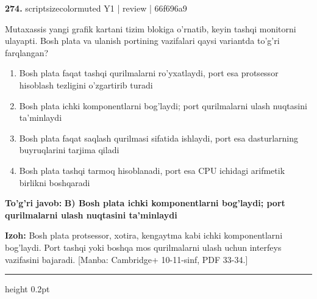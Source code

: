 \documentclass[10pt,a4paper]{article}
\begin{document}
{\bfseries\sffamily\color{ink} 274.} {scriptsizecolor{muted} Y1 | review | 66f696a9}
\par
Mutaxassis yangi grafik kartani tizim blokiga o'rnatib, keyin tashqi monitorni ulayapti. Bosh plata va ulanish portining vazifalari qaysi variantda to'g'ri farqlangan?
\begin{enumerate}[label=\Alph*),leftmargin=9mm]
\item Bosh plata faqat tashqi qurilmalarni ro'yxatlaydi, port esa protsessor hisoblash tezligini o'zgartirib turadi
\item Bosh plata ichki komponentlarni bog'laydi; port qurilmalarni ulash nuqtasini ta'minlaydi
\item Bosh plata faqat saqlash qurilmasi sifatida ishlaydi, port esa dasturlarning buyruqlarini tarjima qiladi
\item Bosh plata tashqi tarmoq hisoblanadi, port esa CPU ichidagi arifmetik birlikni boshqaradi
\end{enumerate}
\begin{tcolorbox}[enhanced,breakable,colback=teal!4,colframe=teal!60!black,boxrule=0.45pt,arc=1.2mm,left=2.7mm,right=2.7mm,top=1.8mm,bottom=1.8mm,before skip=2mm,after skip=2mm]
{\bfseries\sffamily\color{teal}To'g'ri javob:} \textbf{B) Bosh plata ichki komponentlarni bog'laydi; port qurilmalarni ulash nuqtasini ta'minlaydi}
\par\smallskip
{\bfseries Izoh:} Bosh plata protsessor, xotira, kengaytma kabi ichki komponentlarni bog'laydi. Port tashqi yoki boshqa mos qurilmalarni ulash uchun interfeys vazifasini bajaradi. [Manba: Cambridge+ 10-11-sinf, PDF 33-34.]
\end{tcolorbox}
\vspace{2mm}\hrule height 0.2pt\vspace{3mm}
\end{document}
